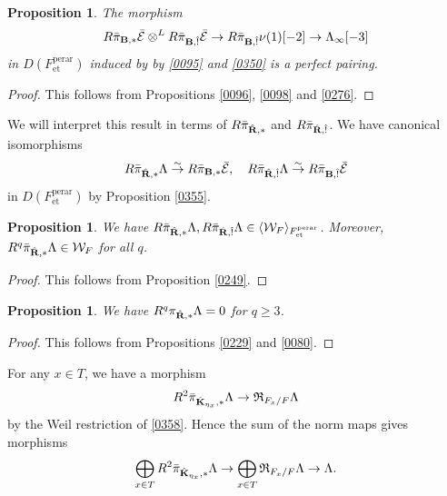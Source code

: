 \documentclass{amsart}
\newtheorem{Prop}[Thm]{Proposition}
\theoremstyle{remark}
\numberwithin{equation}{subsection}
\newcommand{\isomto}{\overset{\sim}{\to}}
\newcommand{\tensor}{\mathbin{\otimes}}
\newcommand{\et}{\mathrm{et}}
\newcommand{\perar}{\mathrm{perar}}
\newcommand{\alg}[1]{\mathbf{#1}}
\newcommand{\genby}[1]{\langle #1 \rangle}
\newcommand{\Weil}{\mathfrak{R}}
\begin{document}
\begin{Prop} \label{0363}
	The morphism
		\[
					R \Bar{\pi}_{\alg{B}, \ast} \Bar{\mathcal{E}}
				\tensor^{L}
					R \Bar{\pi}_{\alg{B}, \Hat{!}} \Bar{\mathcal{E}}
			\to
				R \Bar{\pi}_{\alg{B}, \Hat{!}} \nu(1)[-2]
			\to
				\Lambda_{\infty}[-3]
		\]
	in $D(F^{\perar}_{\et})$ induced by by \eqref{0095} and \eqref{0350}
	is a perfect pairing.
\end{Prop}

\begin{proof}
	This follows from Propositions \ref{0096}, \ref{0098} and \ref{0276}.
\end{proof}

We will interpret this result in terms of
$R \Bar{\pi}_{\Hat{\alg{R}}, \ast}$ and $R \Bar{\pi}_{\Hat{\alg{R}}, \Hat{!}}$.
We have canonical isomorphisms
	\[
				R \Bar{\pi}_{\Hat{\alg{R}}, \ast} \Lambda
			\isomto
				R \Bar{\pi}_{\alg{B}, \ast} \Bar{\mathcal{E}},
		\quad
				R \Bar{\pi}_{\Hat{\alg{R}}, \Hat{!}} \Lambda
			\isomto
				R \Bar{\pi}_{\alg{B}, \Hat{!}} \Bar{\mathcal{E}}
	\]
in $D(F^{\perar}_{\et})$ by Proposition \ref{0355}.

\begin{Prop} \label{0426}
	We have
		$
				R \Bar{\pi}_{\Hat{\alg{R}}, \ast} \Lambda,
				R \Bar{\pi}_{\Hat{\alg{R}}, \Hat{!}} \Lambda
			\in
				\genby{\mathcal{W}_{F}}_{F^{\perar}_{\et}}
		$.
	Moreover, $R^{q} \Bar{\pi}_{\Hat{\alg{R}}, \ast} \Lambda \in \mathcal{W}_{F}$
	for all $q$.
\end{Prop}

\begin{proof}
	This follows from Proposition \ref{0249}.
\end{proof}

\begin{Prop} \label{0421}
	We have $R^{q} \pi_{\Hat{\alg{R}}, \ast} \Lambda = 0$ for $q \ge 3$.
\end{Prop}

\begin{proof}
	This follows from Propositions \ref{0229} and \ref{0080}.
\end{proof}

For any $x \in T$, we have a morphism
	\[
			R^{2} \Bar{\pi}_{\Hat{\alg{K}}_{\eta_{x}}, \ast} \Lambda
		\to
			\Weil_{F_{x} / F} \Lambda
	\]
by the Weil restriction of \eqref{0358}.
Hence the sum of the norm maps gives morphisms
	\[
			\bigoplus_{x \in T}
				R^{2} \Bar{\pi}_{\Hat{\alg{K}}_{\eta_{x}}, \ast} \Lambda
		\to
			\bigoplus_{x \in T}
				\Weil_{F_{x} / F} \Lambda
		\to
			\Lambda.
	\]
\end{document}
